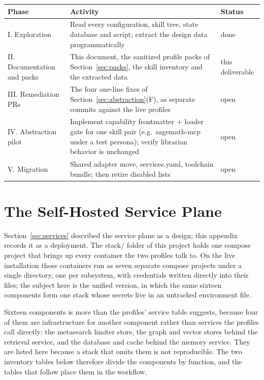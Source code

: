 \documentclass[10pt]{article}
\newcommand{\mono}[1]{{\ttfamily\small #1}}
\begin{document}
\begin{center}
\small
\renewcommand{\arraystretch}{1.2}
\begin{tabularx}{\textwidth}{@{}l X l@{}}
\toprule
Phase & Activity & Status\\
\midrule
I. Exploration & Read every configuration, skill tree, state database and script; extract the design data programmatically & done\\
II. Documentation and packs & This document, the sanitized profile packs of Section~\ref{sec:packs}, the skill inventory and the extracted data & this deliverable\\
III. Remediation PRs & The four one-line fixes of Section~\ref{sec:abstraction}(F), as separate commits against the live profiles & open\\
IV. Abstraction pilot & Implement capability frontmatter + loader gate for one skill pair (e.g.\ \mono{sagemath-mcp} under a test persona); verify librarian behavior is unchanged & open\\
V. Migration & Shared adapter move, services.yaml, toolchain bundle; then retire disabled lists & open\\
\bottomrule
\end{tabularx}
\end{center}

\appendix

\section{The Self-Hosted Service Plane}\label{app:stack}

Section~\ref{sec:services} described the service plane as a design; this appendix records it as a
deployment. The \mono{stack/} folder of this project holds one compose project that brings up every
container the two profiles talk to. On the live installation those containers run as seven separate
compose projects under a single directory, one per subsystem, with credentials written directly into
their files; the subject here is the unified version, in which the same sixteen components form one
stack whose secrets live in an untracked environment file.

Sixteen components is more than the profiles' service table suggests, because four of them are
infrastructure for another component rather than services the profiles call directly: the metasearch
limiter store, the graph and vector stores behind the retrieval service, and the database and cache
behind the memory service. They are listed here because a stack that omits them is not reproducible.
The two inventory tables below therefore divide the components by function, and the tables that follow
place them in the workflow.
\end{document}
